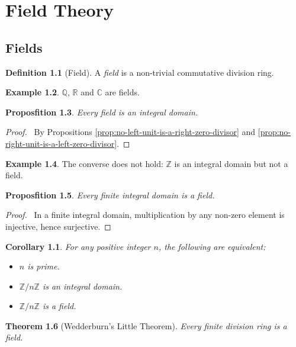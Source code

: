 \documentclass{book}
\let\qed\relax
\newtheorem{prop}{Proposfition}[chapter]
\newtheorem{thm}[prop]{Theorem}
\newtheorem{cor}{Corollary}[prop]
\theoremstyle{definition}
\newtheorem{df}[prop]{Definition}
\newtheorem{ex}[prop]{Example}
\begin{document}
\part{Field Theory}

\chapter{Fields}

\begin{df}[Field]
A \emph{field} is a non-trivial commutative division ring.
\end{df}

\begin{ex}
$\mathbb{Q}$, $\mathbb{R}$ and $\mathbb{C}$ are fields.
\end{ex}

\begin{prop}
Every field is an integral domain.
\end{prop}

\begin{proof}
\pf\ By Propositions \ref{prop:no-left-unit-is-a-right-zero-divisor} and \ref{prop:no-right-unit-is-a-left-zero-divisor}. \qed
\end{proof}

\begin{ex}
The converse does not hold: $\mathbb{Z}$ is an integral domain but not a field.
\end{ex}

\begin{prop}
Every finite integral domain is a field.
\end{prop}

\begin{proof}
\pf\ In a finite integral domain, multiplication by any non-zero element is injective, hence surjective. \qed
\end{proof}

\begin{cor}
For any positive integer $n$, the following are equivalent:
\begin{itemize}
\item $n$ is prime.
\item $\mathbb{Z} / n \mathbb{Z}$ is an integral domain.
\item $\mathbb{Z} / n \mathbb{Z}$ is a field.
\end{itemize}
\end{cor}

\begin{thm}[Wedderburn's Little Theorem]
Every finite division ring is a field.
\end{thm}
\end{document}
